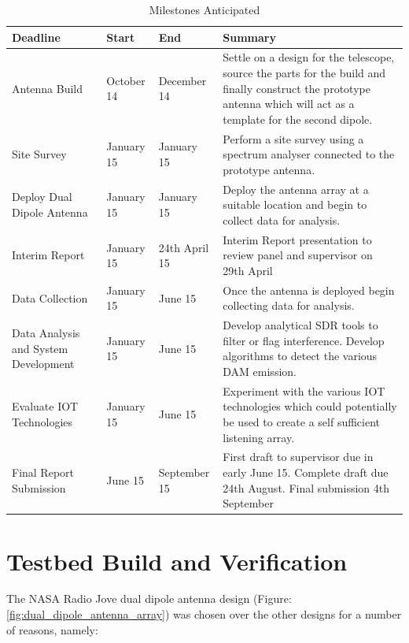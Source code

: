 \documentclass[runningheads,a4paper]{llncs}
\begin{document}
%
\begin{table}
  \centering
  \begin{tabular}{ | p{2cm} | p{2cm} | p{2cm} | p{5cm} |}
    \hline
    Deadline & Start & End & Summary \\ \hline
    Antenna Build & October 14 & December 14 & Settle on a design for the telescope, source the parts for the build
    and finally construct the prototype antenna which will act as a template for the second dipole. \\ \hline
    Site Survey & January 15 & January 15 & Perform a site survey using a spectrum analyser connected to the prototype antenna. \\ \hline
    Deploy Dual Dipole Antenna & January 15 & January 15 & Deploy the antenna array at a suitable location and begin to collect data for analysis. \\ \hline
    Interim Report & January 15 & 24th April 15 & Interim Report presentation to review panel and supervisor on 
    29th April \\ \hline
    Data Collection & January 15 & June 15 & Once the antenna is deployed begin collecting data for analysis. \\ \hline
    Data Analysis and System Development & January 15 & June 15 & Develop analytical SDR tools to filter or flag interference. Develop algorithms to detect the various DAM emission. \\ \hline
    Evaluate IOT Technologies & January 15 & June 15 & Experiment with the various IOT technologies which could potentially be used to create a self sufficient listening array. \\ \hline
    Final Report Submission & June 15 & September 15 & First draft to supervisor due in early June 15. Complete draft due 24th August. Final submission 4th September \\
    \hline
  \end{tabular}
  \caption{Milestones Anticipated}
  \label{tab:milestones_anticipated}
\end{table}
%

%
%
\newpage
\chapter*{Testbed Build and Verification}
The NASA Radio Jove dual dipole antenna design (Figure: \ref{fig:dual_dipole_antenna_array}) was chosen over the other designs for a number of reasons, namely:
\end{document}
